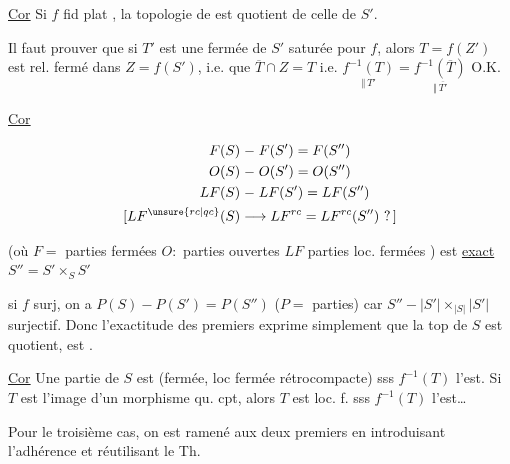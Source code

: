 \uline{Cor} Si $f$ fid plat , la topologie de   est quotient de celle de $S'$.


Il faut prouver que si $T'$ est une fermée de $S'$ saturée pour $f$, alors $T=f(Z')$ est rel. fermé dans $Z=f(S')$, i.e. que $\overline T\cap Z=T$ i.e. $\underset{\Vert\,T'}{f^{-1}(T)}=\underset{\Vert\,\overline{T'}}{f^{-1}(\overline T)}$ O.K.


\uline{Cor}

\[
\begin{aligned}
 F(S)&\mathrel{-}F(S')= F(S'')\\
 O(S)&\mathrel{-}O(S')= O(S'')\\
 LF(S)&\mathrel{-}LF(S')= LF(S'')\\
 [LF^{\unsure{rc|qc}}(S)&\longrightarrow LF^{rc}= LF^{rc}(S'')\ ?\,]
\end{aligned}
\]

(où $F={}$ parties fermées \quad $O:{}$ parties ouvertes \quad $LF$ parties loc. fermées ) est \uline{exact} \quad $S''=S'\times_S S'$


 si $f$ surj, on a \quad $P(S)\mathrel{-}P(S')= P(S'')$ \quad ($P={}$ parties) car $S''\mathrel{-}|S'|\times_{|S|}|S'|$ surjectif. Donc l'exactitude des   premiers exprime simplement que la top de $S$ est quotient,   est .

\uline{Cor} Une partie  de $S$ est  (fermée, loc fermée rétrocompacte) sss $f^{-1}(T)$ l'est. Si $T$ est l'image d'un morphisme qu. cpt, alors $T$ est loc. f. sss $f^{-1}(T)$ l'est\ldots

Pour le troisième cas, on est ramené aux deux premiers en introduisant l'adhérence et réutilisant le Th.

